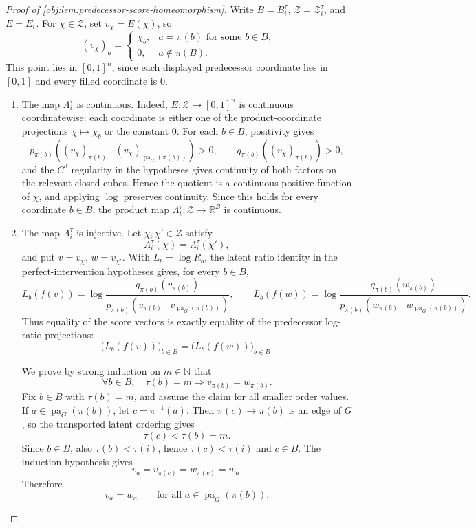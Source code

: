 \begin{proof}[Proof of \cref{obj:lem:predecessor-score-homeomorphism}]
Write \(B=B_i^\tau\), \(\mathcal Z=\mathcal Z_i^\tau\), and \(E=E_i^\tau\). For \(\chi\in\mathcal Z\), set \(v_\chi=E(\chi)\), so
\[
(v_\chi)_a
=
\begin{cases}
\chi_b, & a=\pi(b)\text{ for some }b\in B,\\
0, & a\notin \pi(B).
\end{cases}
\]
This point lies in \([0,1]^n\), since each displayed predecessor coordinate lies in \([0,1]\) and every filled coordinate is \(0\).

\begin{enumerate}
\item The map \(\Lambda_i^\tau\) is continuous. Indeed, \(E:\mathcal Z\to[0,1]^n\) is continuous coordinatewise: each coordinate is either one of the product-coordinate projections \(\chi\mapsto\chi_b\) or the constant \(0\). For each \(b\in B\), positivity gives
\[
p_{\pi(b)}\!\left((v_\chi)_{\pi(b)}\mid (v_\chi)_{\operatorname{pa}_G(\pi(b))}\right)>0,
\qquad
q_{\pi(b)}\!\left((v_\chi)_{\pi(b)}\right)>0,
\]
and the \(C^3\) regularity in the hypotheses gives continuity of both factors on the relevant closed cubes. Hence the quotient is a continuous positive function of \(\chi\), and applying \(\log\) preserves continuity. Since this holds for every coordinate \(b\in B\), the product map \(\Lambda_i^\tau:\mathcal Z\to\mathbb R^B\) is continuous. %

\item The map \(\Lambda_i^\tau\) is injective. Let \(\chi,\chi'\in\mathcal Z\) satisfy
\[
\Lambda_i^\tau(\chi)=\Lambda_i^\tau(\chi'),
\]
and put \(v=v_\chi\), \(w=v_{\chi'}\). With \(L_b=\log R_b\), the latent ratio identity in the perfect-intervention hypotheses gives, for every \(b\in B\),
\[
L_b(f(v))
=
\log
\frac{q_{\pi(b)}(v_{\pi(b)})}
{p_{\pi(b)}(v_{\pi(b)}\mid v_{\operatorname{pa}_G(\pi(b))})},
\qquad
L_b(f(w))
=
\log
\frac{q_{\pi(b)}(w_{\pi(b)})}
{p_{\pi(b)}(w_{\pi(b)}\mid w_{\operatorname{pa}_G(\pi(b))})}.
\]
Thus equality of the score vectors is exactly equality of the predecessor log-ratio projections:
\[
\bigl(L_b(f(v))\bigr)_{b\in B}
=
\bigl(L_b(f(w))\bigr)_{b\in B}.
\]

We prove by strong induction on \(m\in\mathbb N\) that
\[
\forall b\in B,\quad \tau(b)=m\Longrightarrow v_{\pi(b)}=w_{\pi(b)}.
\]
Fix \(b\in B\) with \(\tau(b)=m\), and assume the claim for all smaller order values. If \(a\in\operatorname{pa}_G(\pi(b))\), let \(c=\pi^{-1}(a)\). Then \(\pi(c)\to\pi(b)\) is an edge of \(G\), so the transported latent ordering gives
\[
\tau(c)<\tau(b)=m.
\]
Since \(b\in B\), also \(\tau(b)<\tau(i)\), hence \(\tau(c)<\tau(i)\) and \(c\in B\). The induction hypothesis gives
\[
v_a=v_{\pi(c)}=w_{\pi(c)}=w_a.
\]
Therefore
\[
v_a=w_a
\qquad
\text{for all }a\in\operatorname{pa}_G(\pi(b)).
\]


\end{enumerate}
\end{proof}
